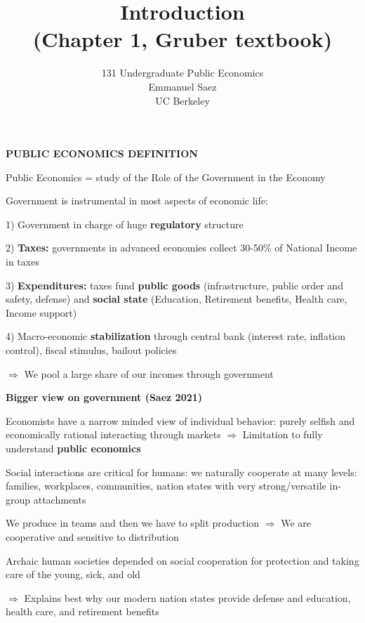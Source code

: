 \documentclass[landscape]{slides}
\author{131 Undergraduate Public Economics \\ Emmanuel Saez \\ UC Berkeley}
\date{}
\title{Introduction \\ (Chapter 1, Gruber textbook)} \onlyslides{1-300}
\begin{document}
\begin{slide}
\maketitle
\end{slide}


\begin{slide}
\begin{center}
{\bf PUBLIC ECONOMICS DEFINITION}
\end{center}
Public Economics  = study
of the Role of the Government in the Economy

Government is instrumental in most aspects of economic life:

1) Government in charge of huge \textbf{regulatory} structure

2) \textbf{Taxes:} governments in advanced economies collect 30-50\% of National Income in taxes

3) \textbf{Expenditures:} taxes fund \textbf{public goods} (infrastructure, public order and safety, defense)
and \textbf{social state} (Education, Retirement benefits, Health care, Income support)

4) Macro-economic \textbf{stabilization} through central bank (interest rate, inflation control), fiscal stimulus, bailout policies

$\Rightarrow$ We pool a large share of our incomes through government
\end{slide}


\begin{slide}
\begin{center}
{\bf Bigger view on government (Saez 2021)}
\end{center}
Economists have a narrow minded view of individual behavior: purely selfish and economically rational interacting through markets
$\Rightarrow$ Limitation to fully understand \textbf{public economics}

Social interactions are critical for humans:  we naturally cooperate at many levels: families, workplaces, communities, nation states
with very strong/versatile in-group attachments

We produce in teams and then we have to split production $\Rightarrow$ We are cooperative and sensitive to distribution

Archaic human societies depended on social cooperation for protection and taking care of the young, sick, and old

$\Rightarrow$ Explains best why our modern nation states provide defense and education, health care, and retirement benefits



\end{slide}
\end{document}
